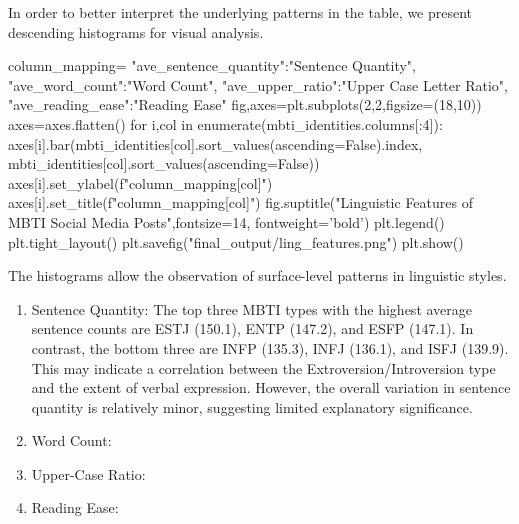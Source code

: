 \documentclass[12pt]{article}
\begin{document}
	In order to better interpret the underlying patterns in the table, we present descending histograms for visual analysis.
	\begin{python}
column_mapping={
    "ave_sentence_quantity":"Sentence Quantity",
    "ave_word_count":"Word Count",
    "ave_upper_ratio":"Upper Case Letter Ratio",
    "ave_reading_ease":"Reading Ease"
}
fig,axes=plt.subplots(2,2,figsize=(18,10))
axes=axes.flatten()
for i,col in enumerate(mbti_identities.columns[:4]):
    axes[i].bar(mbti_identities[col].sort_values(ascending=False).index, mbti_identities[col].sort_values(ascending=False))
    axes[i].set_ylabel(f"{column_mapping[col]}")
    axes[i].set_title(f"{column_mapping[col]}")
fig.suptitle("Linguistic Features of MBTI Social Media Posts",fontsize=14, fontweight='bold')
plt.legend()
plt.tight_layout()
plt.savefig("final_output/ling_features.png")
plt.show()
	\end{python}
\begin{figure}[H]
    \centering
\end{figure}
	The histograms allow the observation of surface-level patterns in linguistic styles.
	\begin{enumerate}
	\item Sentence Quantity: The top three MBTI types with the highest average sentence counts are ESTJ (150.1), ENTP (147.2), and ESFP (147.1). In contrast, the bottom three are INFP (135.3), INFJ (136.1), and ISFJ (139.9). This may indicate a correlation between the Extroversion/Introversion type and the extent of verbal expression. However, the overall variation in sentence quantity is relatively minor, suggesting limited explanatory significance.
	\item Word Count:
	\item Upper-Case Ratio:
	\item Reading Ease:
	\end{enumerate}
	
\end{document}
